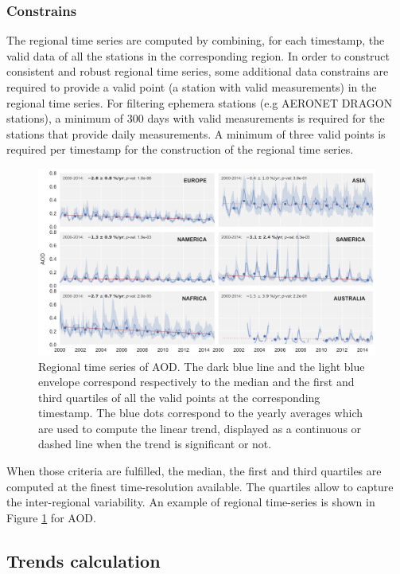 \documentclass[journal abbreviation, manuscript]{copernicus}
\begin{document}
\subsubsection{Constrains}
The regional time series are computed by combining, for each timestamp, the valid data of all the stations in the corresponding region. In order to construct consistent and robust regional time series, some additional data constrains are required to provide a valid point (a station with valid measurements) in the regional time series. For filtering ephemera stations (e.g AERONET DRAGON stations), a minimum of 300 days with valid measurements is required for the stations that provide daily measurements. A minimum of three valid points is required per timestamp for the construction of the regional time series.

\begin{figure}
 \includegraphics[width=16cm]{../scripts/figs/ts/panel-od550aer.png}
 \caption{Regional time series of AOD. The dark blue line and the light blue envelope correspond respectively to the median and the first and third quartiles of all the valid points at the corresponding timestamp. The blue dots correspond to the yearly averages which are used to compute the linear trend, displayed as a continuous or dashed line when the trend is significant or not.}
 \label{fig:ts_aod}
\end{figure}

When those criteria are fulfilled, the median, the first and third quartiles are computed at the finest time-resolution available. The quartiles allow to capture the inter-regional variability. An example of regional time-series is shown in Figure \ref{fig:ts_aod} for AOD.


\subsection{Trends calculation}
\end{document}
